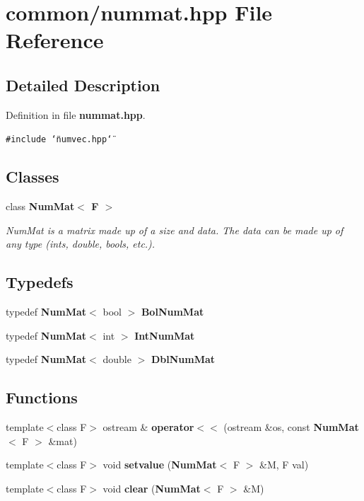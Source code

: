 \section{common/nummat.hpp File Reference}
\label{nummat_8hpp}


\subsection{Detailed Description}


Definition in file {\bf nummat.hpp}.

{\tt \#include \char`\"{}numvec.hpp\char`\"{}}\par
\subsection*{Classes}
\begin{CompactItemize}
\item 
class {\bf Num\-Mat$<$ F $>$}
\begin{CompactList}\small\item\em Num\-Mat is a matrix made up of a size and data. The data can be made up of any type (ints, double, bools, etc.). \item\end{CompactList}\end{CompactItemize}
\subsection*{Typedefs}
\begin{CompactItemize}
\item 
typedef {\bf Num\-Mat}$<$ bool $>$ {\bf Bol\-Num\-Mat}
\item 
typedef {\bf Num\-Mat}$<$ int $>$ {\bf Int\-Num\-Mat}
\item 
typedef {\bf Num\-Mat}$<$ double $>$ {\bf Dbl\-Num\-Mat}
\end{CompactItemize}
\subsection*{Functions}
\begin{CompactItemize}
\item 
template$<$class F$>$ ostream \& {\bf operator$<$$<$} (ostream \&os, const {\bf Num\-Mat}$<$ F $>$ \&mat)
\item 
template$<$class F$>$ void {\bf setvalue} ({\bf Num\-Mat}$<$ F $>$ \&M, F val)
\item 
template$<$class F$>$ void {\bf clear} ({\bf Num\-Mat}$<$ F $>$ \&M)
\end{CompactItemize}


